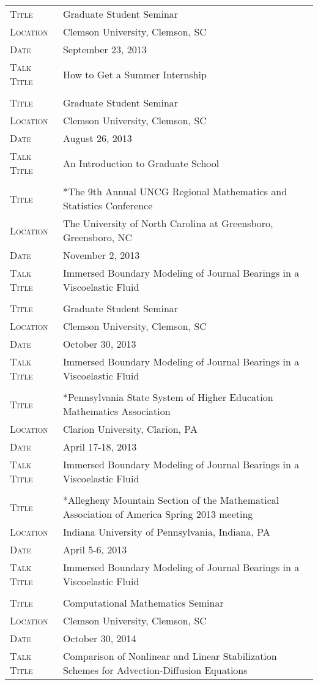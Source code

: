 \documentclass[10pt]{article}
\begin{document}
\begin{tabularx}{0.97\linewidth}{>{\raggedleft\scshape}p{3cm}X}
  Title        & Graduate Student Seminar\\
  Location     & Clemson University, Clemson, SC\\
  Date         & September 23, 2013 \\
  Talk Title   & How to Get a Summer Internship \\
  & \\
    Title        & Graduate Student Seminar\\
  Location     & Clemson University, Clemson, SC\\
  Date         & August 26, 2013 \\
  Talk Title   & An Introduction to Graduate School \\
  & \\
  Title        & *The 9th Annual UNCG Regional Mathematics and Statistics Conference\\
  Location     & The University of North Carolina at Greensboro, Greensboro, NC\\
  Date         & November 2, 2013 \\
  Talk Title   & Immersed Boundary Modeling of Journal Bearings in a Viscoelastic Fluid \\
               & \\
  Title        & Graduate Student Seminar\\
  Location     & Clemson University, Clemson, SC\\
  Date         & October 30, 2013 \\
  Talk Title   & Immersed Boundary Modeling of Journal Bearings in a Viscoelastic Fluid \\
               & \\
  Title        & *Pennsylvania State System of Higher Education Mathematics Association\\
  Location     & Clarion University, Clarion, PA\\
  Date         & April 17-18, 2013 \\
  Talk Title   & Immersed Boundary Modeling of Journal Bearings in a Viscoelastic Fluid \\
               & \\
  Title        & *Allegheny Mountain Section of the Mathematical Association of America Spring 2013 meeting \\
  Location     & Indiana University of Pennsylvania, Indiana, PA\\
  Date         & April 5-6, 2013 \\
  Talk Title   & Immersed Boundary Modeling of Journal Bearings in a Viscoelastic Fluid \\
               & \\
  Title        & Computational Mathematics Seminar\\
  Location     & Clemson University, Clemson, SC\\
  Date         & October 30, 2014 \\
  Talk Title   & Comparison of Nonlinear and Linear Stabilization Schemes for Advection-Diffusion Equations\\
  

\end{tabularx}
\end{document}
